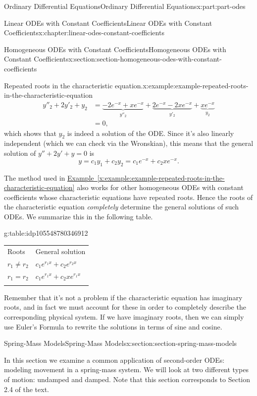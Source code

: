 \documentclass[oneside,10pt,]{book}
\newcommand{\tabularfont}{\relax}
\newcommand{\xreffont}{\relax}
\numberwithin{equation}{part}
\newcommand{\hrulethick} {\noalign{\hrule height 0.11em}}
\newcommand{\amp}{&}
\begin{document}
\begin{partptx}{Ordinary Differential Equations}{}{Ordinary Differential Equations}{}{}{x:part:part-odes}
\begin{chapterptx}{Linear ODEs with Constant Coefficients}{}{Linear ODEs with Constant Coefficients}{}{}{x:chapter:linear-odes-constant-coefficients}
\begin{sectionptx}{Homogeneous ODEs with Constant Coefficients}{}{Homogeneous ODEs with Constant Coefficients}{}{}{x:section:section-homogeneous-odes-with-constant-coefficients}
\begin{example}{Repeated roots in the characteristic equation.}{x:example:example-repeated-roots-in-the-characteristic-equation}
\begin{align*}
y''_{2} + 2y'_{2} + y_{2} \amp = \underbrace{-2e^{-x} + xe^{-x}}_{y''_{2}} + \underbrace{2e^{-x} - 2xe^{-x}}_{y'_{2}} + \underbrace{xe^{-x}}_{y_{2}} \\
\amp = 0, 
\end{align*}
which shows that \(y_{2}\) is indeed a solution of the ODE. Since it's also linearly independent (which we can check via the Wronskian), this means that the general solution of \(y''+2y'+y=0\) is%
\begin{equation*}
y = c_{1}y_{1} + c_{2}y_{2} = c_{1}e^{-x} + c_{2}xe^{-x}. 
\end{equation*}
%
\end{example}
The method used in \hyperref[x:example:example-repeated-roots-in-the-characteristic-equation]{Example~{\xreffont\ref{x:example:example-repeated-roots-in-the-characteristic-equation}}} also works for other homogeneous ODEs with constant coefficients whose characteristic equations have repeated roots. Hence the roots of the characteristic equation \emph{completely} determine the general solutions of such ODEs. We summarize this in the following table.%
\begin{tableptx}{\textbf{}}{g:table:idp105548780346912}{}%
\centering%
{\tabularfont%
\begin{tabular}{ll}\hrulethick
Roots&General solution\tabularnewline\hrulethick
\(r_{1}\neq r_{2}\)&\(c_{1}e^{r_{1}x} + c_{2}e^{r_{2}x}\)\tabularnewline\hrulethick
\(r_{1} = r_{2}\)&\(c_{1}e^{r_{1}x} + c_{2}xe^{r_{1}x}\)\tabularnewline\hrulethick
\end{tabular}
}%
\end{tableptx}%
Remember that it's not a problem if the characteristic equation has imaginary roots, and in fact we must account for these in order to completely describe the corresponding physical system. If we have imaginary roots, then we can simply use Euler's Formula to rewrite the solutions in terms of sine and cosine.%
\end{sectionptx}
%
%
\typeout{************************************************}
\typeout{************************************************}
%
\begin{sectionptx}{Spring-Mass Models}{}{Spring-Mass Models}{}{}{x:section:section-spring-mass-models}
\begin{introduction}{}%
In this section we examine a common application of second-order ODEs: modeling movement in a spring-mass system. We will look at two different types of motion: undamped and damped. Note that this section corresponds to Section 2.4 of the text.%

\end{introduction}
\end{sectionptx}
\end{chapterptx}
\end{partptx}
\end{document}
